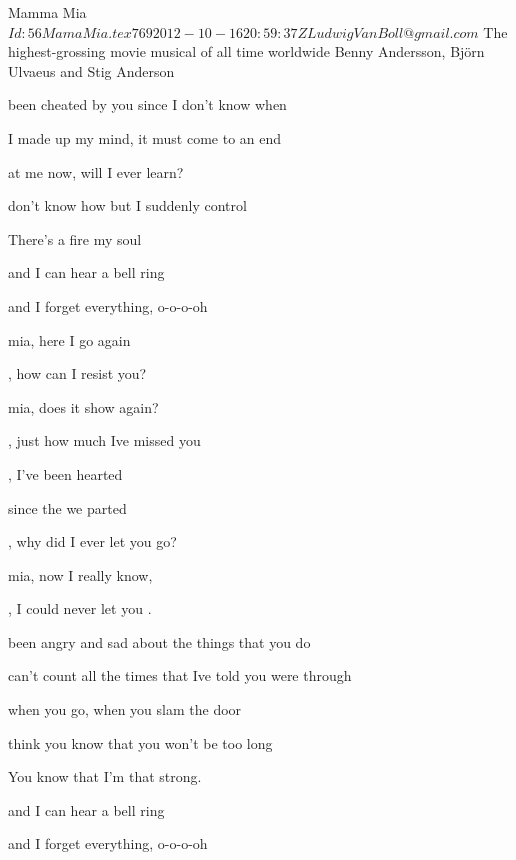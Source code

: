 \begin{SBSong}{Mamma Mia}
  {$Id: 56MamaMia.tex 769 2012-10-16 20:59:37Z LudwigVanBoll@gmail.com $}
  {The highest-grossing movie musical of all time worldwide}
  {Benny Andersson, Bj\"orn Ulvaeus and Stig Anderson}
  \begin{SBVerse}
     been cheated by you since I don't know  when
    
     I made up my mind, it must come to an  end
    
     at me now, will I ever learn?
    
     don't know how but I suddenly  control

    There's a fire  my soul
    
       and I can hear a bell ring
    
       and I forget everything, o-o-o-oh
  \end{SBVerse}
  \begin{SBChorus}
     mia, here I go again

    , how can I resist you?

     mia, does it show again?

    , just how much Ive missed you

    , I've been  hearted

     since the  we parted

    , why did I ever let you go?

     mia, now I really know,

    , I could never let you .
  \end{SBChorus}
  \begin{SBVerse}
     been angry and sad about the things that you  do

     can't count all the times that Ive told you were  through

     when you go, when you slam the door
    
     think you know that you won't be  too long

    You know that I'm  that strong.
    
       and I can hear a bell ring
    
       and I forget everything, o-o-o-oh
  \end{SBVerse}
\end{SBSong}

